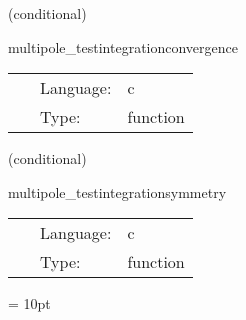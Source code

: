 \vspace{5mm}

   (conditional) 

\hspace{5mm} multipole\_testintegrationconvergence 

\hspace{5mm}{\it test convergence of integration } 


\hspace{5mm}

 \begin{tabular*}{160mm}{cll} 
~ & Language:  & c \\ 
~ & Type:  & function \\ 
\end{tabular*} 


\vspace{5mm}

   (conditional) 

\hspace{5mm} multipole\_testintegrationsymmetry 

\hspace{5mm}{\it test symmetry of integration } 


\hspace{5mm}

 \begin{tabular*}{160mm}{cll} 
~ & Language:  & c \\ 
~ & Type:  & function \\ 
\end{tabular*} 



\vspace{5mm}\parskip = 10pt 
